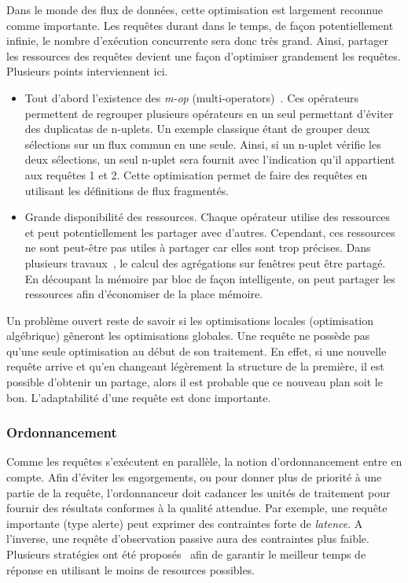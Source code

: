 Dans le monde des flux de données, cette optimisation est largement reconnue comme importante. Les requêtes durant dans le temps, de façon potentiellement infinie, le nombre d'exécution concurrente sera donc très grand. Ainsi, partager les ressources des requêtes devient une façon d'optimiser grandement les requêtes. Plusieurs points interviennent ici.
\begin{itemize}
 \item Tout d'abord l'existence des \textit{m-op} (multi-operators)~\cite{Hong:mqo}. Ces opérateurs permettent de regrouper plusieurs opérateurs en un seul permettant d'éviter des duplicatas de n-uplets. Un exemple classique étant de grouper deux sélections sur un flux commun en une seule. Ainsi, si un n-uplet vérifie les deux sélections, un seul n-uplet sera fournit avec l'indication qu'il appartient aux requêtes 1 et 2. Cette optimisation permet de faire des requêtes en utilisant les définitions de flux fragmentés.
 \item Grande disponibilité des ressources. Chaque opérateur utilise des ressources et peut potentiellement les partager avec d'autres. Cependant, ces ressources ne sont peut-être pas utiles à partager car elles sont trop précises. Dans plusieurs travaux~\cite{Arasu:resource}, le calcul des agrégations sur fenêtres peut être partagé. En découpant la mémoire par bloc de façon intelligente, on peut partager les ressources afin d'économiser de la place mémoire.
\end{itemize}

Un problème ouvert reste de savoir si les optimisations locales (optimisation algébrique) gêneront les optimisations globales. Une requête ne possède pas qu'une seule optimisation au début de son traitement. En effet, si une nouvelle requête arrive et qu'en changeant légèrement la structure de la première, il est possible d'obtenir un partage, alors il est probable que ce nouveau plan soit le bon. L'adaptabilité d'une requête est donc importante.

\subsubsection{Ordonnancement}
Comme les requêtes s'exécutent en parallèle, la notion d'ordonnancement entre en compte. Afin d'éviter les engorgements, ou pour donner plus de priorité à une partie de la requête, l'ordonnanceur doit cadancer les unités de traitement pour fournir des résultats conformes à la qualité attendue. Par exemple, une requête importante (type alerte) peut exprimer des contraintes forte de \textit{latence}. A l'inverse, une requête d'observation passive aura des contraintes plus faible. Plusieurs stratégies ont été proposés~\cite{Babcock:chain, Jiang:scheduling} afin de garantir le meilleur temps de réponse en utilisant le moins de resources possibles.

